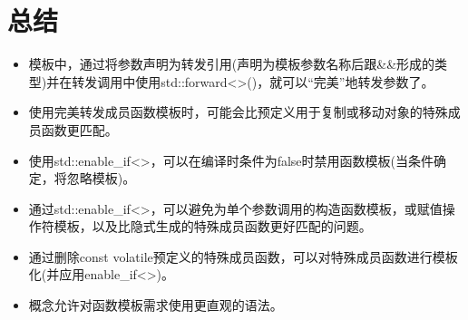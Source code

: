 \section{总结}

\begin{itemize}
\item 
模板中，通过将参数声明为转发引用(声明为模板参数名称后跟\&\&形成的类型)并在转发调用中使用std::forward<>()，就可以“完美”地转发参数了。

\item 
使用完美转发成员函数模板时，可能会比预定义用于复制或移动对象的特殊成员函数更匹配。

\item 
使用std::enable\_if<>，可以在编译时条件为false时禁用函数模板(当条件确定，将忽略模板)。

\item 
通过std::enable\_if<>，可以避免为单个参数调用的构造函数模板，或赋值操作符模板，以及比隐式生成的特殊成员函数更好匹配的问题。

\item 
通过删除const volatile预定义的特殊成员函数，可以对特殊成员函数进行模板化(并应用enable\_if<>)。

\item 
概念允许对函数模板需求使用更直观的语法。
\end{itemize}